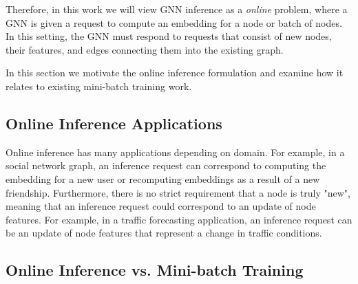 Therefore, in this work we will view GNN inference as a \textit{online} problem, where a GNN is given a request to compute an embedding for a node or batch of nodes. In this setting, the GNN must respond to requests that consist of new nodes, their features, and edges connecting them into the existing graph.

In this section we motivate the online inference formulation and examine how it relates to existing mini-batch training work.

\subsection{Online Inference Applications}
Online inference has many applications depending on domain.
For example, in a social network graph, an inference request can correspond to computing the embedding for a new user or recomputing embeddings as a result of a new friendship. 
Furthermore, there is no strict requirement that a node is truly "new", meaning that an inference request could correspond to an update of node features.
For example, in a traffic forecasting application, an inference request can be an update of node features that represent a change in traffic conditions.

\subsection{Online Inference vs. Mini-batch Training}


